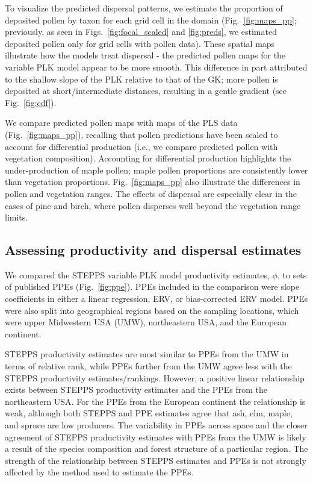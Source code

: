\documentclass[12pt]{article}
\begin{document}
To visualize the predicted dispersal patterns, we estimate the
proportion of deposited pollen by taxon for each grid cell in the
domain (Fig.~\ref{fig:maps_pp}; previously, as seen in
Figs.~\ref{fig:focal_scaled} and \ref{fig:preds}, we estimated
deposited pollen only for grid cells with pollen data). These spatial
maps illustrate how the models treat dispersal - the predicted pollen
maps for the variable PLK model appear to be more smooth. This
difference in part attributed to the shallow slope of the PLK relative
to that of the GK; more pollen is deposited at short/intermediate
distances, resulting in a gentle gradient (see Fig.~\ref{fig:cdf}).

We compare predicted pollen maps with maps of the PLS data
(Fig.~\ref{fig:maps_pp}), recalling that pollen predictions have
been scaled to account for differential production (i.e., we compare
predicted pollen with vegetation composition). Accounting for
differential production highlights the under-production of maple
pollen; maple pollen proportions are consistently lower than
vegetation proportions. Fig.~\ref{fig:maps_pp} also illustrate the
differences in pollen and vegetation ranges. The effects of dispersal
are especially clear in the cases of pine and birch, where pollen
disperses well beyond the vegetation range limits.

\subsection{Assessing productivity and dispersal estimates}

We compared the STEPPS variable PLK model productivity estimates,
$\phi$, to sets of published PPEs (Fig.~\ref{fig:ppe}). PPEs included
in the comparison were slope coefficients in either a linear
regression, ERV, or bias-corrected ERV model.  PPEs were also split
into geographical regions based on the sampling locations, which were
upper Midwestern USA (UMW), northeastern USA, and the European
continent.

 STEPPS productivity estimates are most similar to PPEs from the UMW
 in terms of relative rank, while PPEs further from the UMW agree less
 with the STEPPS productivity estimates/rankings.  However, a positive
 linear relationship exists between STEPPS productivity estimates and
 the PPEs from the northeastern USA. For the PPEs from the European
 continent the relationship is weak, although both STEPPS and PPE
 estimates agree that ash, elm, maple, and spruce are low
 producers. The variability in PPEs across space and the closer
 agreement of STEPPS productivity estimates with PPEs from the UMW is
 likely a result of the species composition and forest structure of a
 particular region. The strength of the relationship between STEPPS
 estimates and PPEs is not strongly affected by the method used to
 estimate the PPEs.
\end{document}
